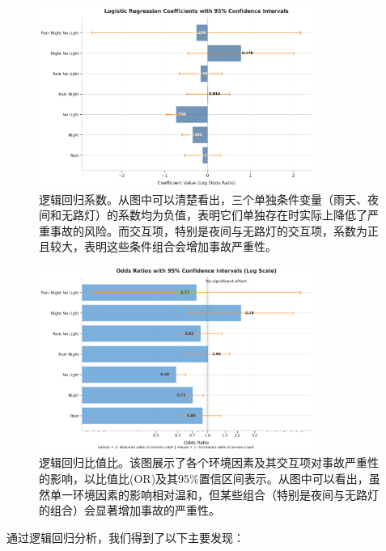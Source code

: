 \documentclass[12pt,a4paper]{article}
\begin{document}
\begin{figure}[H]
\centering
\includegraphics[width=0.8\textwidth]{logistic_regression_coefficients.png}
\caption{逻辑回归系数。从图中可以清楚看出，三个单独条件变量（雨天、夜间和无路灯）的系数均为负值，表明它们单独存在时实际上降低了严重事故的风险。而交互项，特别是夜间与无路灯的交互项，系数为正且较大，表明这些条件组合会增加事故严重性。}
\label{fig:logistic_regression_coefficients}
\end{figure}

\begin{figure}[H]
\centering
\includegraphics[width=0.8\textwidth]{logistic_regression_odds_ratios.png}
\caption{逻辑回归比值比。该图展示了各个环境因素及其交互项对事故严重性的影响，以比值比(OR)及其95\%置信区间表示。从图中可以看出，虽然单一环境因素的影响相对温和，但某些组合（特别是夜间与无路灯的组合）会显著增加事故的严重性。}
\label{fig:logistic_regression_odds_ratios}
\end{figure}

通过逻辑回归分析，我们得到了以下主要发现：
\end{document}
